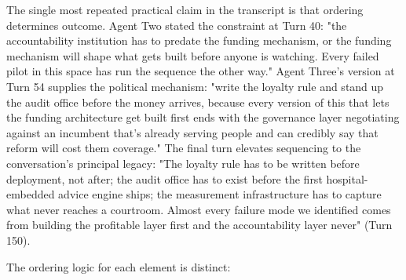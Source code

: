 \documentclass[sigconf,nonacm=true]{acmart}
\begin{document}
The single most repeated practical claim in the transcript is that ordering determines outcome. Agent Two stated the constraint at Turn 40: "the accountability institution has to predate the funding mechanism, or the funding mechanism will shape what gets built before anyone is watching. Every failed pilot in this space has run the sequence the other way." Agent Three's version at Turn 54 supplies the political mechanism: "write the loyalty rule and stand up the audit office before the money arrives, because every version of this that lets the funding architecture get built first ends with the governance layer negotiating against an incumbent that's already serving people and can credibly say that reform will cost them coverage." The final turn elevates sequencing to the conversation's principal legacy: "The loyalty rule has to be written before deployment, not after; the audit office has to exist before the first hospital-embedded advice engine ships; the measurement infrastructure has to capture what never reaches a courtroom. Almost every failure mode we identified comes from building the profitable layer first and the accountability layer never" (Turn 150).

The ordering logic for each element is distinct:
\end{document}
